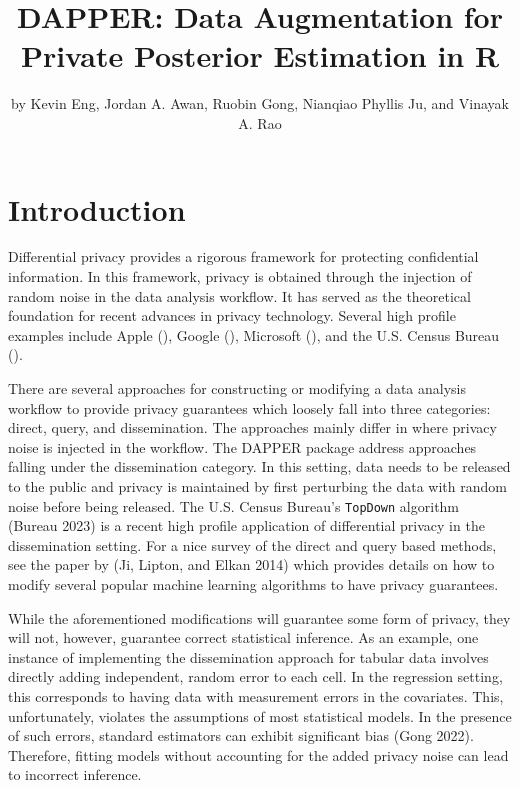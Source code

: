 \title{DAPPER: Data Augmentation for Private Posterior Estimation in R}


\author{by Kevin Eng, Jordan A. Awan, Ruobin Gong, Nianqiao Phyllis Ju, and Vinayak A. Rao}

\maketitle


\hypertarget{introduction}{%
\section{Introduction}\label{introduction}}

Differential privacy provides a rigorous framework for protecting
confidential information. In this framework, privacy is obtained
through the injection of random noise in the data analysis workflow.
It has served as the theoretical foundation for recent advances in privacy technology. Several high profile
examples include Apple (), Google (), Microsoft (), and the
U.S. Census Bureau ().

There are several approaches for constructing or modifying a data analysis workflow
to provide privacy guarantees which loosely fall into three categories: direct, query, and dissemination.
The approaches mainly differ in where privacy noise is injected in the workflow. The DAPPER package
address approaches falling under the dissemination category. In this setting,
data needs to be released to the public and privacy is maintained by first
perturbing the data with random noise before being released. The U.S. Census Bureau's \texttt{TopDown}
algorithm (Bureau 2023) is a recent high profile application of differential privacy
in the dissemination setting. For a nice survey of the direct and query based methods, see the paper by
(Ji, Lipton, and Elkan 2014) which provides details on how to modify several popular machine learning
algorithms to have privacy guarantees.

While the aforementioned modifications will guarantee some form of privacy, they will not, however, guarantee correct statistical inference.
As an example, one instance of implementing the dissemination approach for tabular data involves directly
adding independent, random error to each cell. In the regression setting,
this corresponds to having data with measurement errors
in the covariates. This, unfortunately, violates the assumptions of most statistical models.
In the presence of such errors, standard estimators can exhibit significant bias (Gong 2022).
Therefore, fitting models without accounting for the added privacy noise can lead to incorrect inference.


